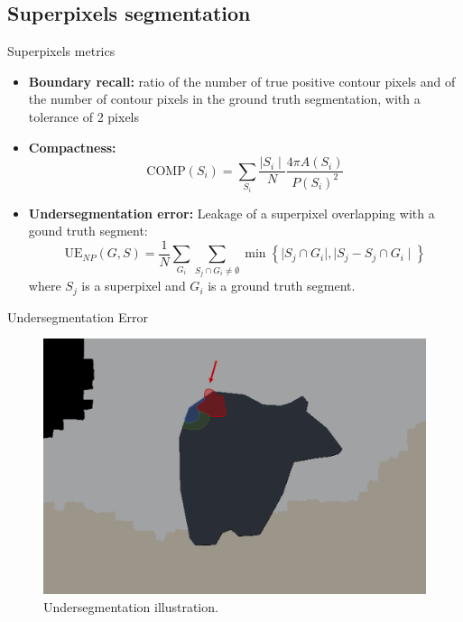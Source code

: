 \documentclass[9pt]{beamer}
\begin{document}
\subsection{Superpixels segmentation}
\begin{frame}{Superpixels metrics}
    \begin{itemize}
        \item \textbf{Boundary recall:} ratio of the number of true positive contour pixels and of the number of contour pixels in the ground truth segmentation, with a tolerance of 2 pixels

        \vspace{5mm}
        \item \textbf{Compactness:}
        $$
        \text{COMP}(S_i) = \sum_{S_i}{\frac{\mid S_i \mid}{N} \frac{4\pi A(S_i)}{P(S_i)^2}}
        $$
        \vspace{5mm}
        \item \textbf{Undersegmentation error:} Leakage of a superpixel overlapping with a gound truth segment:
        $$
        \text{UE}_{NP}(G, S) = \frac{1}{N} \sum_{G_i}{\sum_{S_j\cap G_i \neq \emptyset}{\min \left\{\mid {S_j \cap G_i} \mid, \mid {S_j - S_j \cap G_i}\mid \right\}}}
        $$
        where $S_j$ is a superpixel and $G_i$ is a ground truth segment.
    \end{itemize}
\end{frame}
\begin{frame}{Undersegmentation Error}
\begin{figure}
    \centering
    \includegraphics[width=\textwidth]{pics/underseg.png}
    \caption{Undersegmentation illustration.}
\end{figure}
\end{frame}
\end{document}
